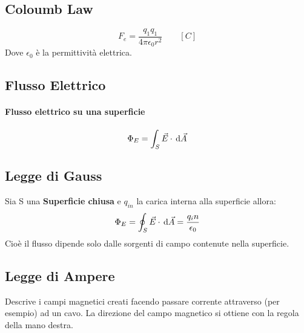 \subsection{Coloumb Law}
\begin{equation}
	F_e = \frac{q_1 q_1}{4\pi \epsilon_0 r^2} \qquad[C] \tag{Forza di Coloumb}
\end{equation}
Dove $\epsilon_0$ è la permittività elettrica.

\subsection{Flusso Elettrico}
\paragraph{Flusso elettrico su una superficie}
\begin{equation}
	\Phi_E = \int_{S} \vec{E} \cdot \,\mathrm{d} \vec{A}
\end{equation}

\subsection{Legge di Gauss}
Sia S una \textbf{Superficie chiusa} e $q_{in}$ la carica interna alla superficie allora:
\begin{equation}
	\Phi_E = \oint_{S} \vec{E} \cdot \,\mathrm{d} \vec{A} = \frac{q_in}{\epsilon_0}
\end{equation}
Cioè il flusso dipende solo dalle sorgenti di campo contenute nella superficie.
\subsection{Legge di Ampere}
Descrive i campi magnetici creati facendo passare corrente attraverso (per esempio) ad un cavo. La direzione del campo magnetico si ottiene con la regola della mano destra.

